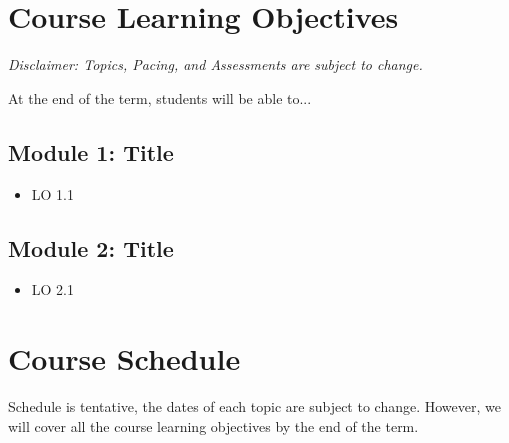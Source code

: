 \documentclass{article}
\begin{document}
\section*{Course Learning Objectives}
\emph{Disclaimer: Topics, Pacing, and Assessments are subject to change.}

At the end of the term, students will be able to...

\subsection*{Module 1: Title}
\begin{itemize}[noitemsep]

\item{LO 1.1}

\end{itemize}

\subsection*{Module 2: Title}
\begin{itemize}[noitemsep]
	
	\item{LO 2.1}
	
\end{itemize}

\section*{Course Schedule}
Schedule is tentative, the dates of each topic are subject to change.  However, we will cover all the course learning objectives by the end of the term.
\end{document}
